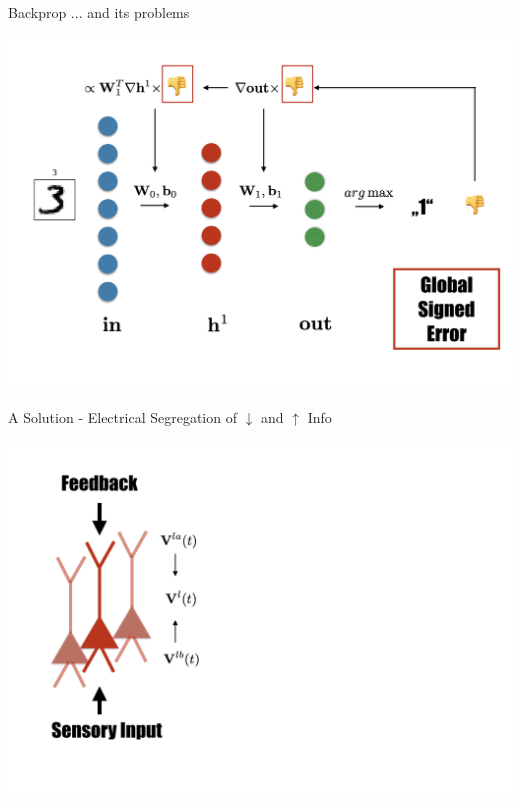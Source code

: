 \documentclass[dvipsnames, usenames]{beamer}
\begin{document}
\begin{frame}[noframenumbering]{Backprop ... and its problems}

\centering 
\includegraphics[width=1.1\textwidth]{../figures/report/bp_5}
\end{frame}


\begin{frame}{A Solution - Electrical Segregation of $\downarrow$ and $\uparrow$ Info}

\centering 
\includegraphics[width=1.1\textwidth]{../figures/report/elec_seg_1}
\end{frame}
\end{document}
